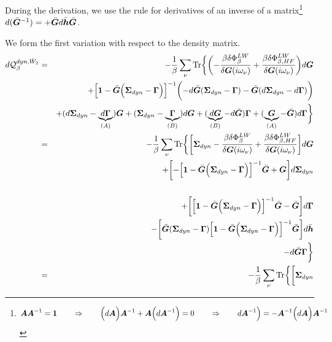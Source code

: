 \documentclass[11pt,a4paper]{report}
\begin{document}
During the derivation, we use the rule for derivatives of an inverse of
a matrix\footnote{\begin{eqnarray} 
\bm{A}\bm{A}^{-1}=\bm{1}
\qquad\Rightarrow\qquad
\Bigl(d\bm{A}\Bigr)\bm{A}^{-1}
+\bm{A}\Bigl(d\bm{A}^{-1}\Bigr)=0
\qquad\Rightarrow\qquad
d\bm{A}^{-1}\Bigr)=-\bm{A}^{-1}\Bigl(d\bm{A}\Bigr)\bm{A}^{-1}
\end{eqnarray}
}
$d(\bar{\bm{G}}^{-1})=+\bar{\bm{G}}d\bar{\bm{h}}\bar{\bm{G}}$.

We form the first variation with respect to the density matrix.
\begin{eqnarray}
d\mathcal{Q}_{\beta}^{dyn,\hat{W}_2}
&=&
-\frac{1}{\beta}\sum_\nu\Tr\biggl\lbrace
\biggl(-\frac{\beta\delta\Phi^{LW}_\beta}{\delta\mat{G}(i\omega_\nu)}
+\frac{\beta\delta\Phi^{LW}_{\beta,HF}}{\delta\mat{G}(i\omega_\nu)}\biggr)d\mat{G}
\nonumber\\
&&+\Bigl[\mat{1}-\bar{\mat{G}}
\Bigl(\mat{\Sigma}_{dyn}-\mat{\Gamma}\Bigr)\Bigr]^{-1}
\biggl(-d\bar{\mat{G}}(\mat{\Sigma}_{dyn}-\mat{\Gamma})
-\bar{\mat{G}}(d\mat{\Sigma}_{dyn}-d\mat{\Gamma})\biggr)
\nonumber\\
&&+(d\mat{\Sigma}_{dyn}-\underbrace{d\mat{\Gamma}}_{(A)})\mat{G}
+(\mat{\Sigma}_{dyn}-\underbrace{\mat{\Gamma}}_{(B)})d\mat{G}
+(\underbrace{d\mat{G}}_{(B)}-d\bar{\mat{G}})\mat{\Gamma}
+(\underbrace{\mat{G}}_{(A)}-\bar{\mat{G}})d\mat{\Gamma}
\biggr\rbrace
\nonumber\\
&=&
-\frac{1}{\beta}\sum_\nu\Tr\biggl\lbrace
\biggr[\mat{\Sigma}_{dyn}
-\frac{\beta\delta\Phi^{LW}_\beta}{\delta\mat{G}(i\omega_\nu)}
+\frac{\beta\delta\Phi^{LW}_{\beta,HF}}{\delta\mat{G}(i\omega_\nu)}
\biggr]d\mat{G}
\nonumber\\
&&+\biggl[
-\Bigl[\mat{1}-\bar{\mat{G}}
\Bigl(\mat{\Sigma}_{dyn}-\mat{\Gamma}\Bigr)\Bigr]^{-1}
\bar{\mat{G}}+\mat{G}\biggr]d\mat{\Sigma}_{dyn}
\nonumber\\
&&
\nonumber\\
&&+\biggl[\Bigl[\mat{1}-\bar{\mat{G}}
\Bigl(\mat{\Sigma}_{dyn}-\mat{\Gamma}\Bigr)\Bigr]^{-1}
\bar{\mat{G}}
-\bar{\mat{G}}
\biggr]d\mat{\Gamma}
\nonumber\\
&&
-\biggl[\bar{\mat{G}}(\mat{\Sigma}_{dyn}-\mat{\Gamma})
\Bigl[\mat{1}-\bar{\mat{G}}
\Bigl(\mat{\Sigma}_{dyn}-\mat{\Gamma}\Bigr)\Bigr]^{-1}
\bar{\mat{G}}\biggr]d\bar{\mat{h}}
\nonumber\\
&&
-d\bar{\mat{G}}\mat{\Gamma}
\biggr\rbrace
\nonumber\\
&=&
-\frac{1}{\beta}\sum_\nu\Tr\biggl\lbrace
\biggr[\mat{\Sigma}_{dyn}

\end{eqnarray}
\end{document}
